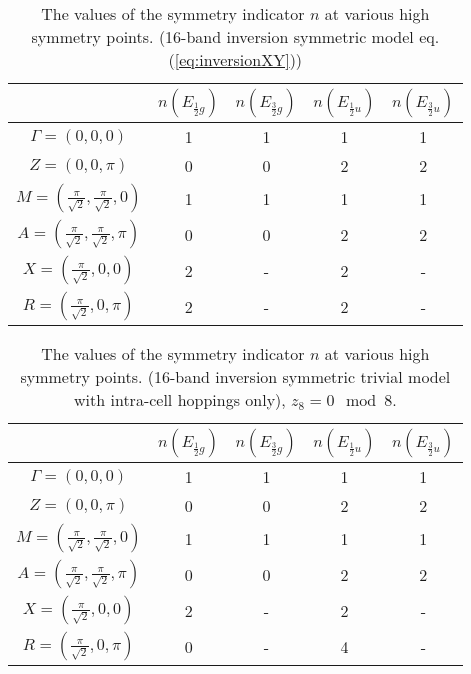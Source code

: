  \begin{table}[h]
 \begin{tabular}{c|cccc}
   & $n(E_{\frac{1}{2}g})$ & $n(E_{\frac{3}{2}g})$ & $n(E_{\frac{1}{2}u})$ & $n(E_{\frac{3}{2}u})$ \\
 \hline 
 $\Gamma = (0,0,0)$ & 1 & 1 & 1 & 1 \\
 $Z = (0,0,\pi)$ & 0 & 0 & 2 & 2 \\
 $M = (\frac{\pi}{\sqrt{2}},\frac{\pi}{\sqrt{2}},0)$ & 1 & 1 & 1 & 1 \\
 $A = (\frac{\pi}{\sqrt{2}},\frac{\pi}{\sqrt{2}},\pi)$ & 0 & 0 & 2 & 2 \\ 
 $X = (\frac{\pi}{\sqrt{2}},0,0)$ & 2 & - & 2 & - \\
 $R = (\frac{\pi}{\sqrt{2}},0,\pi)$ & 2 & - & 2 & -
 \end{tabular}
 \caption{The values of the symmetry indicator $n$ at various high symmetry points. (16-band inversion symmetric model eq.(\ref{eq:inversionXY}))} \label{SymmetryIndicator}
 \end{table}
 
 \begin{table}[h]
 \begin{tabular}{c|cccc}
   & $n(E_{\frac{1}{2}g})$ & $n(E_{\frac{3}{2}g})$ & $n(E_{\frac{1}{2}u})$ & $n(E_{\frac{3}{2}u})$ \\
 \hline 
 $\Gamma = (0,0,0)$ & 1 & 1 & 1 & 1 \\
 $Z = (0,0,\pi)$ & 0 & 0 & 2 & 2 \\
 $M = (\frac{\pi}{\sqrt{2}},\frac{\pi}{\sqrt{2}},0)$ & 1 & 1 & 1 & 1 \\
 $A = (\frac{\pi}{\sqrt{2}},\frac{\pi}{\sqrt{2}},\pi)$ & 0 & 0 & 2 & 2 \\ 
 $X = (\frac{\pi}{\sqrt{2}},0,0)$ & 2 & - & 2 & - \\
 $R = (\frac{\pi}{\sqrt{2}},0,\pi)$ & 0 & - & 4 & -
 \end{tabular}
 \caption{The values of the symmetry indicator $n$ at various high symmetry points. (16-band inversion symmetric trivial model with intra-cell hoppings only), $z_8 = 0 \mod 8$.} \label{SymmetryIndicatortriv1}
 \end{table}
 

